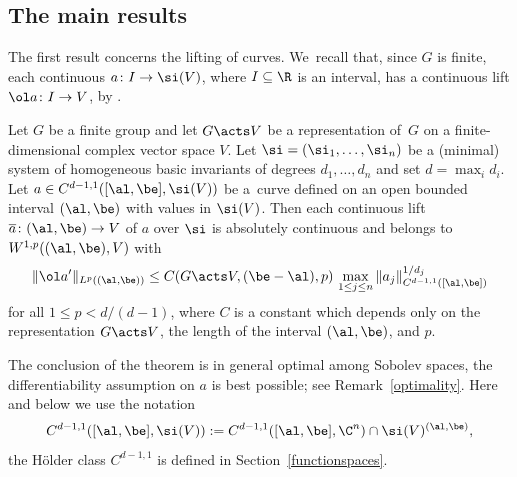 \subsection{The main results}


The first result concerns the lifting of curves. We~recall that, since $G$ is finite, each continuous $a \colon I \to \si(V)$, where $I\subseteq \R$ is an interval,
has a continuous lift $\ol a \colon I \to V$, by \cite[Theorem 5.1]{LMRac}.



\begin{Theorem}\label{main}
 Let $G$ be a finite group and let $G \acts V$ be a representation of~$G$ on a finite-dimensional
 complex vector space $V$. Let $\si=(\si_1,\dots,\si_n)$ be a (minimal) system of homogeneous
 basic invariants of degrees $d_1,\dots,d_n$ and set $d = \max_i d_i$.
 Let $a \in C^{d-1,1}([\al,\be],\si(V))$ be a~curve
 defined on an open bounded interval
 $(\al,\be)$ with values in $\si(V)$.
 Then each continuous lift $\overline a \colon (\al,\be) \to V$ of $a$ over $\si$ is absolutely continuous and
 belongs to $W^{1,p}((\al,\be),V)$
 with
 \begin{gather} \label{eq:main}
 	 \|\ol a'\|_{L^p((\al,\be))} \le
 C(G \acts V,(\be-\al),p)\, \max_{1 \le j \le n} \|a_j\|^{1/d_j}_{C^{d-1,1}([\al, \be])}		
 	\end{gather}	
 for all $1 \le p < d/(d-1)$,
 where $C$ is a constant which depends only on the representation $G \acts V$, the length of the interval $(\al,\be)$, and $p$.	
\end{Theorem}

{\samepage
The conclusion of the theorem is in general optimal among Sobolev spaces, the differentiability assumption on $a$ is best possible;
see Remark~\ref{optimality}.
Here and below we use the notation
\begin{gather*}
 C^{d-1,1}([\al,\be],\si(V)) := C^{d-1,1}([\al,\be],\C^n) \cap \si(V)^{(\al,\be)},
\end{gather*}
the H\"older class $C^{d-1,1}$ is defined in Section~\ref{functionspaces}.

}
